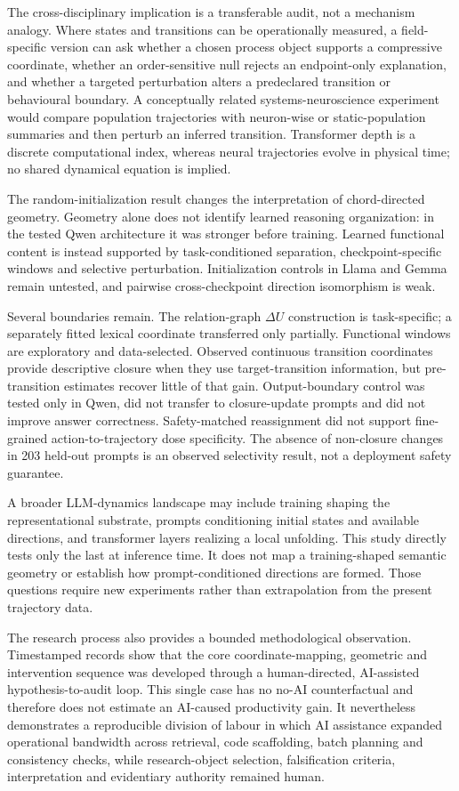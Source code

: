 \documentclass[11pt]{article}
\begin{document}
The cross-disciplinary implication is a transferable audit, not a mechanism analogy. Where states and transitions can be operationally measured, a field-specific version can ask whether a chosen process object supports a compressive coordinate, whether an order-sensitive null rejects an endpoint-only explanation, and whether a targeted perturbation alters a predeclared transition or behavioural boundary. A conceptually related systems-neuroscience experiment would compare population trajectories with neuron-wise or static-population summaries and then perturb an inferred transition. Transformer depth is a discrete computational index, whereas neural trajectories evolve in physical time; no shared dynamical equation is implied.

The random-initialization result changes the interpretation of chord-directed geometry. Geometry alone does not identify learned reasoning organization: in the tested Qwen architecture it was stronger before training. Learned functional content is instead supported by task-conditioned separation, checkpoint-specific windows and selective perturbation. Initialization controls in Llama and Gemma remain untested, and pairwise cross-checkpoint direction isomorphism is weak.

Several boundaries remain. The relation-graph $\Delta U$ construction is task-specific; a separately fitted lexical coordinate transferred only partially. Functional windows are exploratory and data-selected. Observed continuous transition coordinates provide descriptive closure when they use target-transition information, but pre-transition estimates recover little of that gain. Output-boundary control was tested only in Qwen, did not transfer to closure-update prompts and did not improve answer correctness. Safety-matched reassignment did not support fine-grained action-to-trajectory dose specificity. The absence of non-closure changes in 203 held-out prompts is an observed selectivity result, not a deployment safety guarantee.

A broader LLM-dynamics landscape may include training shaping the representational substrate, prompts conditioning initial states and available directions, and transformer layers realizing a local unfolding. This study directly tests only the last at inference time. It does not map a training-shaped semantic geometry or establish how prompt-conditioned directions are formed. Those questions require new experiments rather than extrapolation from the present trajectory data.

The research process also provides a bounded methodological observation. Timestamped records show that the core coordinate-mapping, geometric and intervention sequence was developed through a human-directed, AI-assisted hypothesis-to-audit loop. This single case has no no-AI counterfactual and therefore does not estimate an AI-caused productivity gain. It nevertheless demonstrates a reproducible division of labour in which AI assistance expanded operational bandwidth across retrieval, code scaffolding, batch planning and consistency checks, while research-object selection, falsification criteria, interpretation and evidentiary authority remained human.
\end{document}

